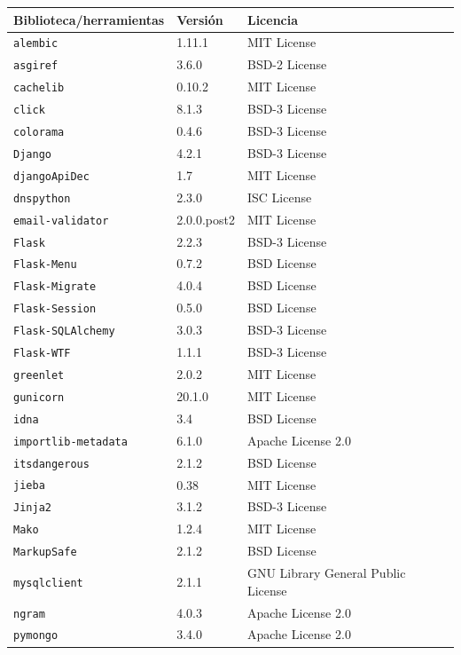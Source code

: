 \begin{table}
\centering 
\begin{tabular}{|l|p{}|p{}|}
\hline
\textbf{Biblioteca/herramientas} & \textbf{Versión} & \textbf{Licencia} \\
\hline
\texttt{alembic} & 1.11.1 & MIT License \\
\texttt{asgiref} & 3.6.0 & BSD-2 License \\
\texttt{cachelib} & 0.10.2 & MIT License \\
\texttt{click} & 8.1.3 & BSD-3 License \\
\texttt{colorama} & 0.4.6 & BSD-3 License \\
\texttt{Django} & 4.2.1 & BSD-3 License \\
\texttt{djangoApiDec} & 1.7 & MIT License \\
\texttt{dnspython} & 2.3.0 & ISC License \\
\texttt{email-validator} & 2.0.0.post2 & MIT License \\
\texttt{Flask} & 2.2.3 & BSD-3 License \\
\texttt{Flask-Menu} & 0.7.2 & BSD License \\
\texttt{Flask-Migrate} & 4.0.4 & BSD License \\
\texttt{Flask-Session} & 0.5.0 & BSD License \\
\texttt{Flask-SQLAlchemy} & 3.0.3 & BSD-3 License \\
\texttt{Flask-WTF} & 1.1.1 & BSD-3 License \\
\texttt{greenlet} & 2.0.2 & MIT License \\
\texttt{gunicorn} & 20.1.0 & MIT License \\
\texttt{idna} & 3.4 & BSD License \\
\texttt{importlib-metadata} & 6.1.0 & Apache License 2.0 \\
\texttt{itsdangerous} & 2.1.2 & BSD License \\
\texttt{jieba} & 0.38 & MIT License \\
\texttt{Jinja2} & 3.1.2 & BSD-3 License \\
\texttt{Mako} & 1.2.4 & MIT License \\
\texttt{MarkupSafe} & 2.1.2 & BSD License \\
\texttt{mysqlclient} & 2.1.1 & GNU Library General Public License \\
\texttt{ngram} & 4.0.3 & Apache License 2.0 \\
\texttt{pymongo} & 3.4.0 & Apache License 2.0 \\

\end{tabular}
\end{table}
